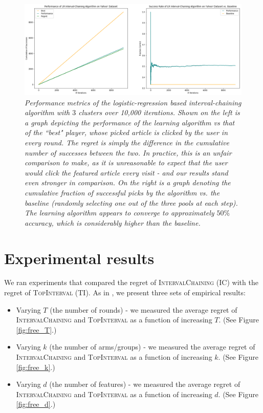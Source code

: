 \documentclass[11pt]{article}
\begin{document}
\begin{figure}
\includegraphics[width=\textwidth]{yahoo-interval-chaining.png}
\caption{\emph{Performance metrics of the logistic-regression based interval-chaining algorithm with $3$ clusters over 10,000 iterations. Shown on the left is a graph depicting the performance of the learning algorithm vs that of the ``best" player, whose picked article is clicked by the user in every round. The regret is simply the difference in the cumulative number of successes between the two. In practice, this is an unfair comparison to make, as it is unreasonable to expect that the user would click the featured article every visit - and our results stand even stronger in comparison. On the right is a graph denoting the cumulative fraction of successful picks by the algorithm vs. the baseline (randomly selecting one out of the three pools at each step). The learning algorithm appears to converge to approximately $50\%$ accuracy, which is considerably higher than the baseline.} \label{fig:yahoo}}
\end{figure}

\section{Experimental results}

We ran experiments that compared the regret of \textsc{IntervalChaining} (IC) with the regret of \textsc{TopInterval} (TI). As in , we present three sets of empirical results: 
\begin{itemize}
	\item Varying $T$ (the number of rounds) - we measured the average regret of \textsc{IntervalChaining} and \textsc{TopInterval} as a function of increasing $T$. (See Figure \ref{fig:free_T}.)
	\item Varying $k$ (the number of arms/groups) - we measured the average regret of \textsc{IntervalChaining} and \textsc{TopInterval} as a function of increasing $k$. (See Figure \ref{fig:free_k}.)
	\item Varying $d$ (the number of features) - we measured the average regret of \textsc{IntervalChaining} and \textsc{TopInterval} as a function of increasing $d$. (See Figure \ref{fig:free_d}.)
\end{itemize} 
\end{document}
